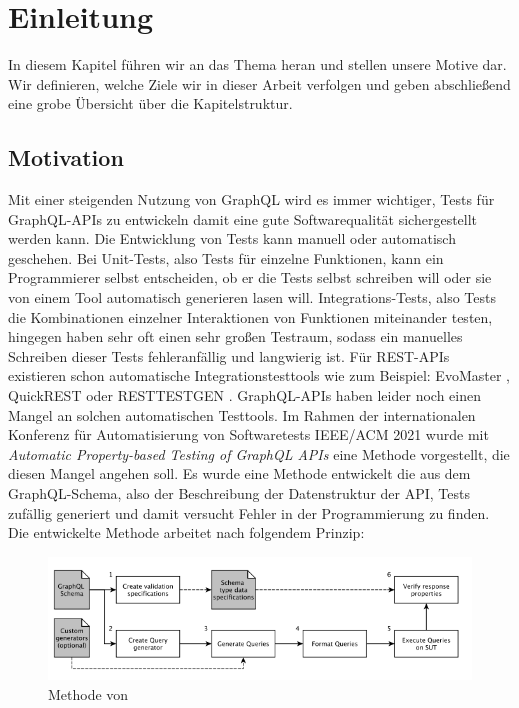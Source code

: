 \chapter{Einleitung}

In diesem Kapitel führen wir an das Thema heran und stellen unsere Motive dar.
Wir definieren, welche Ziele wir in dieser Arbeit verfolgen und geben abschließend eine grobe Übersicht über die
Kapitelstruktur.

\section{Motivation}

Mit einer steigenden Nutzung von GraphQL wird es immer wichtiger, Tests für GraphQL-APIs zu entwickeln damit eine
gute Softwarequalität sichergestellt werden kann.
Die Entwicklung von Tests kann manuell oder automatisch geschehen.
Bei Unit-Tests, also Tests für einzelne Funktionen, kann ein Programmierer selbst entscheiden, ob er die Tests selbst schreiben will
oder sie von einem Tool automatisch generieren lasen will.
Integrations-Tests, also Tests die Kombinationen einzelner Interaktionen von Funktionen miteinander testen, hingegen haben sehr oft
einen sehr großen Testraum, sodass ein manuelles Schreiben dieser Tests fehleranfällig und langwierig ist.
Für REST-APIs existieren schon automatische Integrationstesttools wie zum Beispiel: EvoMaster \cite{evo-master} , QuickREST \cite{karlsson2019quickrest} oder RESTTESTGEN \cite{rest-test-gen}.
GraphQL-APIs haben leider noch einen Mangel an solchen automatischen Testtools.
Im Rahmen der internationalen  Konferenz für Automatisierung  von  Softwaretests IEEE/ACM 2021 wurde mit
\textit{Automatic Property-based Testing of GraphQL APIs}\cite{property-based-testing} eine Methode vorgestellt, die diesen Mangel angehen soll.
Es wurde eine Methode entwickelt die aus dem GraphQL-Schema, also der Beschreibung der Datenstruktur der API, Tests zufällig generiert und damit versucht Fehler in der Programmierung zu finden.
Die entwickelte Methode arbeitet nach folgendem Prinzip:

\begin{figure}[h!]
    \centering
    \includegraphics[width=\textwidth,height=\textheight,keepaspectratio]{content/einleitung/toolchain}
    \caption{Methode von~\cite{property-based-testing}}
    \label{property-based-method}
\end{figure}

